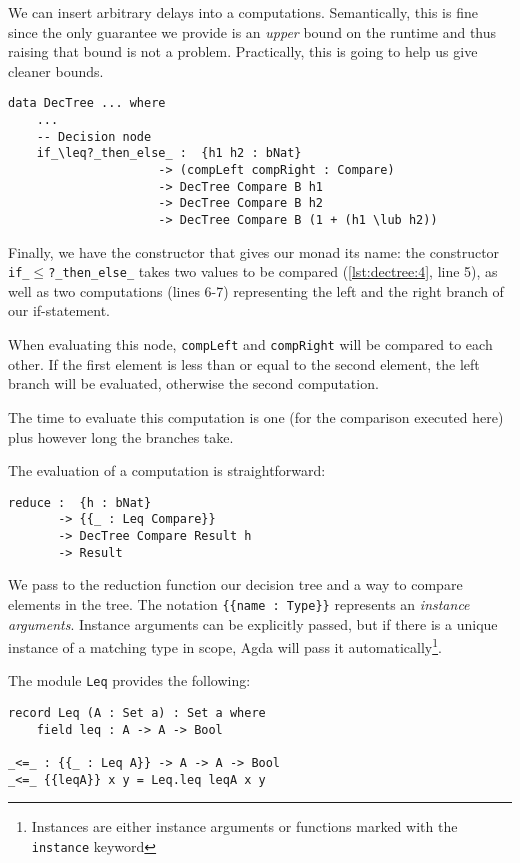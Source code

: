 We can insert arbitrary delays into a computations. Semantically, this is fine since the only guarantee we provide is an \emph{upper} bound on the runtime and thus raising that bound is not a problem. Practically, this is going to help us give cleaner bounds.

\begin{lstlisting}[caption={The DecTree monad (branching)},label={lst:dectree:5},emph={DecTree,if,then,else}]
data DecTree ... where
    ...
    -- Decision node
    if_\leq?_then_else_ :  {h1 h2 : bNat}
                     -> (compLeft compRight : Compare)
                     -> DecTree Compare B h1
                     -> DecTree Compare B h2
                     -> DecTree Compare B (1 + (h1 \lub h2))
\end{lstlisting}

Finally, we have the constructor that gives our monad its name: the constructor \texttt{if\_$\leq$?\_then\_else\_} takes two values to be compared (\autoref{lst:dectree:4}, line 5), as well as two computations (lines 6-7) representing the left and the right branch of our if-statement.

When evaluating this node, \texttt{compLeft} and \texttt{compRight} will be compared to each other. If the first element is less than or equal to the second element, the left branch will be evaluated, otherwise the second computation.

The time to evaluate this computation is one (for the comparison executed here) plus however long the branches take.

The evaluation of a computation is straightforward:

\begin{lstlisting}[caption={Evaluating the monad},label={lst:dectree-eval:1},emph={reduce,DecTree}]
reduce :  {h : bNat}
       -> {{_ : Leq Compare}}
       -> DecTree Compare Result h
       -> Result
\end{lstlisting}

We pass to the reduction function our decision tree and a way to compare elements in the tree. The notation \texttt{\{\{name : Type\}\}} represents an \emph{instance arguments}. Instance arguments can be explicitly passed, but if there is a unique instance of a matching type in scope, Agda will pass it automatically\footnote{Instances are either instance arguments or functions marked with the \texttt{instance} keyword}.

The module \texttt{Leq} provides the following:

\begin{lstlisting}[caption={Module Leq},label={lst:dectree:leq},emph={Leq}]
record Leq (A : Set a) : Set a where
    field leq : A -> A -> Bool

_<=_ : {{_ : Leq A}} -> A -> A -> Bool
_<=_ {{leqA}} x y = Leq.leq leqA x y
\end{lstlisting}

